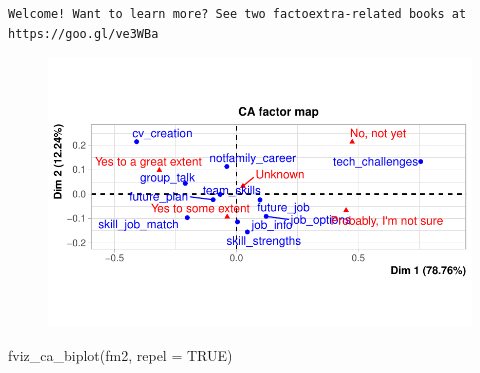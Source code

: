 \documentclass[
  12pt]{article}
\newenvironment{Shaded}{\begin{snugshade}}{\end{snugshade}}
\newcommand{\AttributeTok}[1]{\textcolor[rgb]{0.40,0.45,0.13}{#1}}
\newcommand{\CommentTok}[1]{\textcolor[rgb]{0.37,0.37,0.37}{#1}}
\newcommand{\ConstantTok}[1]{\textcolor[rgb]{0.56,0.35,0.01}{#1}}
\newcommand{\FunctionTok}[1]{\textcolor[rgb]{0.28,0.35,0.67}{#1}}
\newcommand{\NormalTok}[1]{\textcolor[rgb]{0.00,0.23,0.31}{#1}}
\newcommand{\OtherTok}[1]{\textcolor[rgb]{0.00,0.23,0.31}{#1}}
\newcommand{\SpecialCharTok}[1]{\textcolor[rgb]{0.37,0.37,0.37}{#1}}
\newcommand{\StringTok}[1]{\textcolor[rgb]{0.13,0.47,0.30}{#1}}
\begin{document}
\begin{verbatim}
Welcome! Want to learn more? See two factoextra-related books at https://goo.gl/ve3WBa
\end{verbatim}

\begin{Shaded}
\end{Shaded}

\begin{figure}[H]

{\centering \includegraphics{Journal_article_files/figure-pdf/unnamed-chunk-7-1.pdf}

}

\end{figure}

\begin{Shaded}
\begin{Highlighting}[]
\FunctionTok{fviz\_ca\_biplot}\NormalTok{(fm2, }\AttributeTok{repel =} \ConstantTok{TRUE}\NormalTok{)}
\end{Highlighting}
\end{Shaded}
\end{document}
